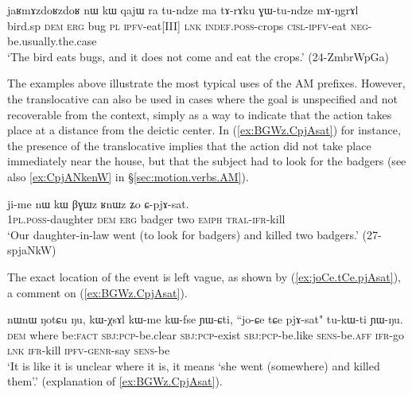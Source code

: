 \begin{exe}
\ex \label{ex:GWtundze.mANgrAl}
\gll  jaʁmɤzdoʁzdoʁ nɯ kɯ qajɯ ra tu-ndze ma tɤ-rɤku ɣɯ-tu-ndze mɤ-ŋgrɤl \\
bird.sp \textsc{dem} \textsc{erg} bug \textsc{pl} \textsc{ipfv}-eat[III] \textsc{lnk} \textsc{indef}.\textsc{poss}-crops \textsc{cisl}-\textsc{ipfv}-eat \textsc{neg}-be.usually.the.case \\
\glt `The bird  eats bugs, and it does not come and eat the crops.' (24-ZmbrWpGa)
\end{exe}

The examples above illustrate the most typical uses of the AM prefixes. However, the translocative can also be used in cases where the goal is unspecified and not recoverable from the context, simply as a way to indicate that the action takes place at a distance from the deictic center. In (\ref{ex:BGWz.CpjAsat}) for instance, the presence of the translocative implies that the action did not take place immediately near the house, but that the subject had to look for the badgers (see also \ref{ex:CpjANkenW} in §\ref{sec:motion.verbs.AM}).

\begin{exe}
\ex  \label{ex:BGWz.CpjAsat}
 \gll  ji-me nɯ kɯ βɣɯz ʁnɯz ʑo ɕ-pjɤ-sat. \\
\textsc{1pl}.\textsc{poss}-daughter \textsc{dem} \textsc{erg} badger two \textsc{emph} \textsc{tral}-\textsc{ifr}-kill \\
\glt `Our daughter-in-law went (to look for badgers) and killed two badgers.' (27-spjaNkW)
\end{exe}

The exact location of the event is left vague, as shown by  (\ref{ex:joCe.tCe.pjAsat}), a comment on (\ref{ex:BGWz.CpjAsat}).

\begin{exe}
\ex  \label{ex:joCe.tCe.pjAsat}
 \gll  nɯnɯ ŋotɕu ŋu, kɯ-χsɤl kɯ-me kɯ-fse ɲɯ-ɕti, ``jo-ɕe tɕe pjɤ-sat" tu-kɯ-ti ɲɯ-ŋu. \\
 \textsc{dem} where be:\textsc{fact} \textsc{sbj}:\textsc{pcp}-be.clear \textsc{sbj}:\textsc{pcp}-exist   \textsc{sbj}:\textsc{pcp}-be.like \textsc{sens}-be.\textsc{aff} \textsc{ifr}-go \textsc{lnk} \textsc{ifr}-kill \textsc{ipfv}-\textsc{genr}-say \textsc{sens}-be \\
 \glt `It is like it is unclear where it is, it means `she went (somewhere) and killed them'.' (explanation of \ref{ex:BGWz.CpjAsat}).
\end{exe}

